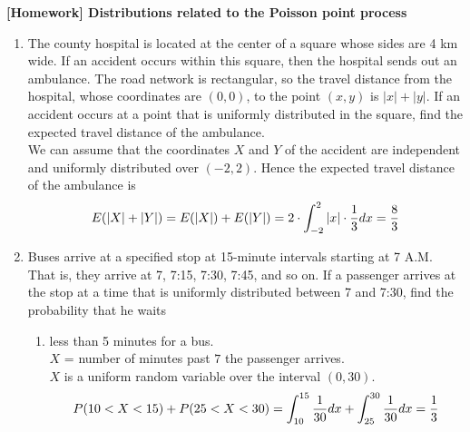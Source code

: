 \documentclass[12pt]{article}%
\newcommand{\0}{{\bf 0}}
\newcommand{\ra}[1]{\renewcommand{\arraystretch}{#1}}
\begin{document}
\newcommand{\ngi}{n \ra \infty}

\pagestyle{myheadings} 

\thispagestyle{plain}


\begin{center}
{\Large\bf [Homework] Distributions related to the Poisson point process} 
\end{center}






\begin{enumerate}



\item
The county hospital is located at the center of a square whose sides are 4 km wide. If an accident occurs within this square, then the hospital sends out an ambulance. The road network is rectangular, so the travel distance from the hospital, whose coordinates are $(0, 0)$, to the point $(x, y)$ is $|x| + |y|$. If an accident occurs at a point that is uniformly distributed in the square, find the expected travel distance of the ambulance.
\\
{\color{blue}{\bf Sol.}}
We can assume that the coordinates $X$ and $Y$ of the accident are independent and uniformly distributed over $(-2, 2)$. Hence the expected travel distance of the ambulance is
 $$E(|X| + |Y |) = E(|X|) + E(|Y |)=2\cdot \int_{-2}^{2}|x|\cdot\frac{1}{3} dx = \frac{8}{3}$$
 
 

\item
Buses arrive at a specified stop at 15-minute intervals starting at 7 A.M. 
That is, they arrive at 7, 7:15, 7:30, 7:45, and so on. 
If a passenger arrives at the stop at a time that is uniformly distributed between 7 and 7:30, find the probability that he waits
\begin{enumerate}
\item
less than 5 minutes for a bus.
\\
{\color{blue}{\bf Sol.}}
$X$ = number of minutes past $7$ the passenger arrives.\\
$X$ is a uniform random variable over the interval $(0,30)$.
$$P(10 < X <15) + P(25 < X <30) = \int_{10}^{15} \frac{1}{30} dx +\int_{25}^{30} \frac{1}{30} dx =\frac{1}{3}$$

 





\end{enumerate}
\end{enumerate}
\end{document}
